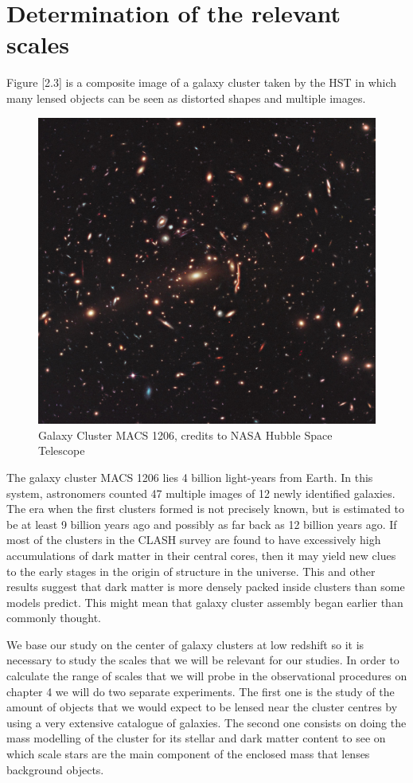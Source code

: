 \chapter{Determination of the relevant scales}

Figure [2.3] is a composite image of a galaxy cluster taken by the HST in which many lensed objects can be seen as distorted shapes and multiple images. 

\begin{figure}[H]
\centering
\includegraphics[width=12cm]{images/GC.jpg}
\caption[Galaxy Cluster MACS 1206]{Galaxy Cluster MACS 1206, credits to NASA Hubble Space Telescope}
\end{figure}

The galaxy cluster MACS 1206 lies 4 billion light-years from Earth. In this system, astronomers counted 47 multiple images of 12 newly identified galaxies. The era when the first clusters formed is not precisely known, but is estimated to be at least 9 billion years ago and possibly as far back as 12 billion years ago. If most of the clusters in the CLASH survey are found to have excessively high accumulations of dark matter in their central cores, then it may yield new clues to the early stages in the origin of structure in the universe. This and other results suggest that dark matter is more densely packed inside clusters than some models predict. This might mean that galaxy cluster assembly began earlier than commonly thought.

We base our study on the center of galaxy clusters at low redshift so it is necessary to study the scales that we will be relevant for our studies. In order to calculate the range of scales that we will probe in the observational procedures on chapter 4 we will do two separate experiments. The first one is the study of the amount of objects that we would expect to be lensed near the cluster centres by using a very extensive catalogue of galaxies. The second one consists on doing the mass modelling of the cluster for its stellar and dark matter content to see on which scale stars are the main component of the enclosed mass that lenses background objects.

